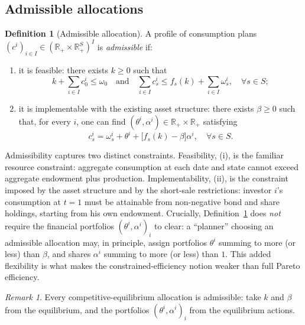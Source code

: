 \documentclass[11pt,a4paper,oneside]{book}
\def\R{\mathbb{R}}
\def\leq{\leqslant}
\def\geq{\geqslant}
\def\et{\quad \text{and} \quad}
\theoremstyle{plain}
\theoremstyle{definition}
\newtheorem{definition}[theorem]{Definition}
\theoremstyle{remark}
\newtheorem{remark}[theorem]{Remark}
\numberwithin{equation}{chapter}
\begin{document}
\subsection{Admissible allocations}

\begin{definition}[Admissible allocation]\label{def:admissible-alloc}
A profile of consumption plans $(c^i)_{i \in I} \in (\R_+ \times \R_+^S)^I$ is \emph{admissible} if:
\begin{enumerate}
  \item[\textup{(i)}] it is feasible: there exists $k \geq 0$ such that
  \begin{equation*}
    k + \sum_{i \in I} c^i_0 \leq \omega_0
    \et
    \sum_{i \in I} c^i_s \leq f_s(k) + \sum_{i \in I} \omega^i_s, \quad \forall s \in S;
  \end{equation*}
  \item[\textup{(ii)}] it is implementable with the existing asset structure: there exists $\beta \geq 0$ such that, for every $i$, one can find $(\theta^i, \alpha^i) \in \R_+ \times \R_+$ satisfying
  \begin{equation*}
    c^i_s = \omega^i_s + \theta^i + \bigl[ f_s(k) - \beta \bigr] \alpha^i, \quad \forall s \in S.
  \end{equation*}
\end{enumerate}
\end{definition}

Admissibility captures two distinct constraints.
Feasibility, (i), is the familiar resource constraint: aggregate consumption at each date and state cannot exceed aggregate endowment plus production.
Implementability, (ii), is the constraint imposed by the asset structure and by the short-sale restrictions: investor $i$'s consumption at $t=1$ must be attainable from non-negative bond and share holdings, starting from his own endowment.
Crucially, Definition~\ref{def:admissible-alloc} does \emph{not} require the financial portfolios $(\theta^i, \alpha^i)_{i}$ to clear: a ``planner'' choosing an admissible allocation may, in principle, assign portfolios $\theta^i$ summing to more (or less) than $\beta$, and shares $\alpha^i$ summing to more (or less) than $1$.
This added flexibility is what makes the constrained-efficiency notion weaker than full Pareto efficiency.

\begin{remark}\label{rem:eq-is-admissible}
Every competitive-equilibrium allocation is admissible: take $k$ and $\beta$ from the equilibrium, and the portfolios $(\theta^i, \alpha^i)_i$ from the equilibrium actions.
\end{remark}
\end{document}
